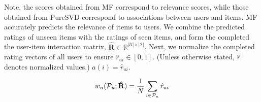  Note,  the scores obtained from MF correspond to relevance scores, while  those obtained from PureSVD  correspond to associations between users and items.
MF accurately predicts the relevance of  items to users.  We combine the predicted ratings of unseen items with the   ratings of seen items, and form the completed the user-item interaction matrix,  $\mathbf{\hat{R}} \in \mathbb{R}^{\vert \mathcal{U} \vert \times \vert \mathcal{I} \vert}$.   Next, we normalize the completed rating vectors  of all users to ensure  $\hat{r}_{ui} \in [0,1]$. (Unless otherwise stated, $\hat{r}$ denotes normalized values.) $a(i) =\hat{r}_{ui} $. %
 
\begin{equation}
\small
w_u(\mathcal{P}_u ; \mathbf{\hat{R}} ) =\frac{1}{N} \sum_{i \in \mathcal{P}_u}{\hat{r}_{ui}}
\label{eq:modular-relevance}
\end{equation}
\fi 


